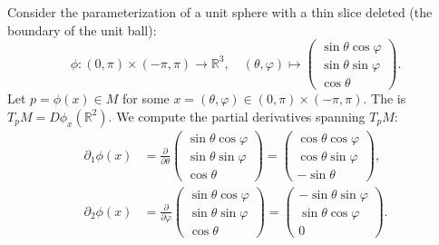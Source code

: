 \begin{example} %
Consider the parameterization of a unit sphere with a thin slice deleted (the boundary of the unit ball): %
\[
\phi : (0, \pi) \times (-\pi, \pi) \to \mathbb{R}^3, \quad (\theta, \varphi) \mapsto 
\begin{pmatrix}
\sin\theta \cos\varphi \\
\sin\theta \sin\varphi \\
\cos\theta
\end{pmatrix}. %
\]
Let $p = \phi(x) \in M$ for some $x = (\theta, \varphi) \in (0, \pi) \times (-\pi, \pi)$. %
The  is $T_pM = D\phi_x(\mathbb{R}^2)$. %
We compute the partial derivatives spanning $T_pM$: %
\begin{align*}
\partial_1\phi(x) &= \frac{\partial}{\partial\theta} 
\begin{pmatrix}
\sin\theta \cos\varphi \\
\sin\theta \sin\varphi \\
\cos\theta
\end{pmatrix}
= 
\begin{pmatrix}
\cos\theta \cos\varphi \\
\cos\theta \sin\varphi \\
-\sin\theta
\end{pmatrix}, %
\\[1em]
\partial_2\phi(x) &= \frac{\partial}{\partial\varphi} 
\begin{pmatrix}
\sin\theta \cos\varphi \\
\sin\theta \sin\varphi \\
\cos\theta
\end{pmatrix}
= 
\begin{pmatrix}
-\sin\theta \sin\varphi \\
\sin\theta \cos\varphi \\
0
\end{pmatrix}. %
\end{align*}


\end{example}
